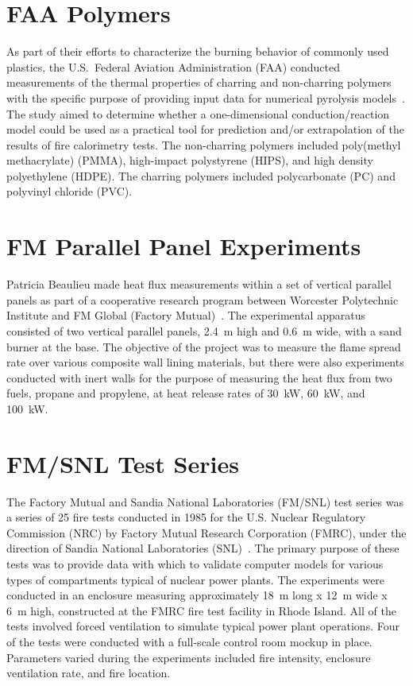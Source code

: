 \section{FAA Polymers}

As part of their efforts to characterize the burning behavior of commonly used plastics, the U.S.~Federal Aviation Administration (FAA) conducted measurements of the thermal properties of
charring and non-charring polymers with the specific purpose of providing input data for numerical pyrolysis models~\cite{Stoliarov:CF2009,Stoliarov:CF2010}.
The study aimed to determine whether a one-dimensional conduction/reaction model could be used
as a practical tool for prediction and/or extrapolation of the results of fire calorimetry tests. The non-charring polymers included poly(methyl methacrylate) (PMMA),
high-impact polystyrene (HIPS), and high density
polyethylene (HDPE). The charring polymers included polycarbonate (PC) and polyvinyl chloride (PVC).



\section{FM Parallel Panel Experiments}

Patricia Beaulieu made heat flux measurements within a set of vertical parallel panels as part of a cooperative research
program between Worcester Polytechnic Institute and FM Global (Factory Mutual)~\cite{Beaulieu:FM}. The experimental
apparatus consisted of two vertical parallel
panels, 2.4~m high and 0.6~m wide, with a sand burner at the base. The objective of the project was to measure the flame spread
rate over various composite wall lining materials, but there were also experiments conducted with inert walls for the purpose of measuring the
heat flux from two fuels, propane and propylene, at heat release rates of 30~kW, 60~kW, and 100~kW.



\section{FM/SNL Test Series}

The Factory Mutual and Sandia National Laboratories (FM/SNL) test series was a series of 25 fire
tests conducted in 1985 for the U.S. Nuclear Regulatory Commission (NRC) by Factory Mutual Research Corporation (FMRC), under
the direction of Sandia National Laboratories (SNL)~\cite{Nowlen:NUREG4681,Nowlen:NUREG4527}. The primary purpose of these tests was to
provide data with which to validate computer models for various types of compartments typical of nuclear power plants. The
experiments were conducted in an enclosure measuring approximately 18~m long x 12~m wide x 6~m high, constructed at the FMRC fire test facility in Rhode Island.
All of the tests involved forced ventilation to simulate typical power plant operations. Four of
the tests were conducted with a full-scale control room mockup in place. Parameters varied
during the experiments included fire intensity, enclosure ventilation rate, and fire location.

